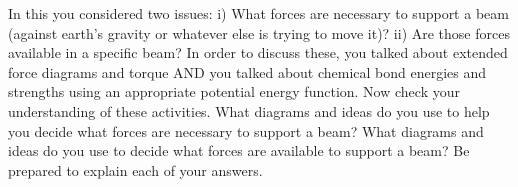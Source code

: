 \label{fnt7.3.4-1}

In this \DL{} you considered two issues: 
i) 	What forces are necessary to support a beam (against earth's gravity or whatever else is trying to move it)? 
ii) 	Are those forces available in a specific beam?
 In order to discuss these, you talked about extended force diagrams and torque AND you talked about chemical bond energies and strengths using an appropriate potential energy function.   Now check your understanding of these \DL{} activities.  What diagrams and ideas do you use to help you decide what forces are necessary to support a beam?  What diagrams and ideas do you use to decide what forces are available to support a beam?  Be prepared to explain each of your answers.